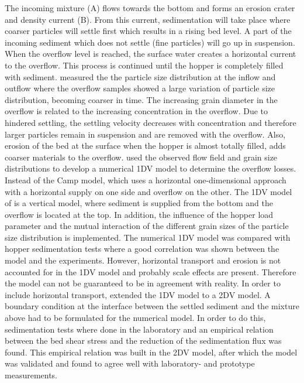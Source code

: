 \noindent The incoming mixture (A) flows towards the bottom and forms an erosion crater and density current (B). From this current, sedimentation will take place where coarser particles will settle first which results in a rising bed level. A part of the incoming sediment which does not settle (fine particles) will go up in suspension. When the overflow level is reached, the surface water creates a horizontal current to the overflow. This process is continued until the hopper is completely filled with sediment.\newline \cite{Rhee} measured the the particle size distribution at the inflow and outflow where the overflow samples showed a large variation of particle size distribution, becoming coarser in time. The increasing grain diameter in the overflow is related to the increasing concentration in the overflow. Due to hindered settling, the settling velocity decreases with concentration and therefore larger particles remain in suspension and are removed with the overflow. Also, erosion of the bed at the surface when the hopper is almost totally filled, adds coarser materials to the overflow. \newline
\cite{Rhee} used the observed flow field and grain size distributions to develop a numerical 1DV model to determine the overflow losses. Instead of the Camp model, which uses a horizontal one-dimensional approach with a horizontal supply on one side and overflow on the other. The 1DV model of \cite{Rhee} is a vertical model, where sediment is supplied from the bottom and the overflow is located at the top. In addition, the influence of the hopper load parameter and the mutual interaction of the different grain sizes of the particle size distribution is implemented. The numerical 1DV model was compared with hopper sedimentation tests where a good correlation was shown between the model and the experiments. However, horizontal transport and erosion is not accounted for in the 1DV model and probably scale effects are present. Therefore the model can not be guaranteed to be in agreement with reality. \newline In order to include horizontal transport, \cite{Rhee} extended the 1DV model to a 2DV model. A boundary condition at the interface between the settled sediment and the mixture above had to be formulated for the numerical model. In order to do this, sedimentation tests where done in the laboratory and an empirical relation between the bed shear stress and the reduction of the sedimentation flux was found. This empirical relation was built in the 2DV model, after which the model was validated and found to agree well with laboratory- and prototype measurements.

